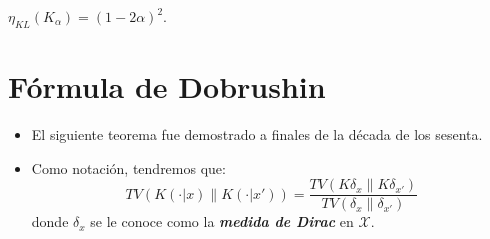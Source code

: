 \begin{example}
    $\eta_{KL}(K_\alpha)=(1-2\alpha)^2$.
\end{example}

\section{F\'ormula de Dobrushin}

\begin{itemize}
    \item El siguiente teorema fue demostrado a finales de la d\'ecada de los sesenta.
    \item Como notaci\'on, tendremos que:
    \begin{equation*}
        TV(K(\cdot|x)\| K(\cdot|x'))=\frac{TV(K\delta_x\|K\delta_{x'})}{TV(\delta_x\|\delta_{x'})}
    \end{equation*}
    donde $\delta_x$ se le conoce como la \textit{\textbf{medida de Dirac}} en $\mathcal{X}$.
\end{itemize}

